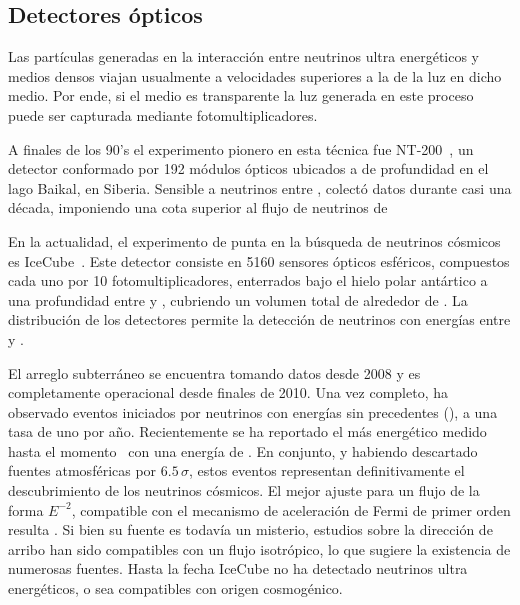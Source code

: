 	\subsection{Detectores \'opticos}
	Las part\'iculas generadas en la interacci\'on entre neutrinos ultra energ\'eticos y medios densos viajan usualmente a velocidades superiores a la de la luz en dicho medio.
	Por ende, si el medio es transparente la luz \cher{} generada en este proceso puede ser capturada mediante fotomultiplicadores.
	
	A finales de los 90's el experimento pionero en esta t\'ecnica fue NT-200~\cite{cite:nt200}, un detector conformado por 192 m\'odulos \'opticos ubicados a  de profundidad en el lago Baikal, en Siberia.
	Sensible a neutrinos entre , colectó datos durante casi una d\'ecada, imponiendo una cota superior al flujo de neutrinos de 
	
	En la actualidad, el experimento de punta en la b\'usqueda de neutrinos c\'osmicos es IceCube~\cite{cite:IceCube1}.
	Este detector consiste en 5160 sensores \'opticos esf\'ericos, compuestos cada uno por 10 fotomultiplicadores, enterrados bajo el hielo polar ant\'artico a una profundidad entre  y , cubriendo un volumen total de alrededor de .
	La distribuci\'on de los detectores permite la detecci\'on de neutrinos con energ\'ias entre  y .
	
	El arreglo subterráneo se encuentra tomando datos desde 2008 y es completamente operacional desde finales de 2010. 
	Una vez completo, ha observado eventos iniciados por neutrinos con energ\'ias sin precedentes (), a una tasa de uno por a\~no.
	Recientemente se ha reportado el m\'as energ\'etico medido hasta el momento~\cite{cite:iceCubeEvent} con una energ\'ia de .
	En conjunto, y habiendo descartado fuentes atmosf\'ericas por $6.5\,\sigma$, estos eventos representan definitivamente el descubrimiento de los neutrinos c\'osmicos.
	El mejor ajuste para un flujo de la forma $E^{-2}$, compatible con el mecanismo de aceleraci\'on de Fermi de primer orden resulta \cite{cite:multimess}.
	Si bien su fuente es todav\'ia un misterio, estudios sobre la direcci\'on de arribo han sido compatibles con un flujo isotr\'opico, lo que sugiere la existencia de numerosas fuentes.
	Hasta la fecha IceCube no ha detectado neutrinos ultra energ\'eticos, o sea compatibles con origen cosmog\'enico.
	
